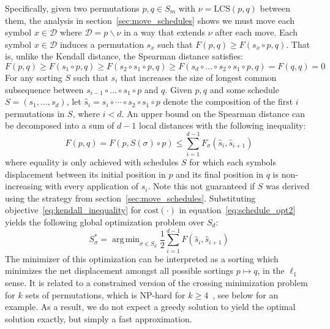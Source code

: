 \documentclass{siamart190516}
\DeclareMathOperator*{\argmin}{arg\,min}
\begin{document}
Specifically, given two permutations $p,q \in S_m$ with $\nu = \mathrm{LCS}(p,q)$ between them, the analysis in section~\ref{sec:move_schedules} shows we must move each symbol $x \in \mathcal{D}$ where $\mathcal{D} = p \smallsetminus \nu $ in a way that extends $\nu$ after each move. Each symbol $x \in \mathcal{D}$ induces a permutation $s_x$ such that $F(p, q) \geq F(s_x \circ p, q)$. That is, unlike the Kendall distance, the Spearman distance satisfies: 
$$ F(p, q) \geq F(s_1 \circ p, q) \geq F( s_2 \circ s_1 \circ p, q) \geq F( s_d \circ \dots \circ s_2 \circ s_1 \circ p, q)  = F(q,q) = 0 $$
For any sorting $S$ such that $s_{i}$ that increases the size of longest common subsequence between $s_{i-1} \circ \dots \circ s_1 \circ p$ and $q$. Given $p, q$ and some schedule $S = (s_1, \dots, s_d)$, let $\hat{s}_i =  s_i \circ \cdots \circ s_2 \circ s_1 \circ p$ denote the composition of the first $i$ permutations in $S$, where $i < d$. An upper bound on the Spearman distance can be decomposed into a sum of $d-1$ local distances with the following inequality:
\begin{equation}\label{eq:kendall_inequality}
F(p, q) = F(p, S(\sigma) \circ p) \leq \sum\limits_{i=1}^{d-1} F_\sigma(\hat{s}_i, \hat{s}_{i+1})
\end{equation}
where equality is only achieved with schedules $S$ for which each symbols displacement between its initial position in $p$ and its final position in $q$ is non-increasing with every application of $s_i$. Note this not guaranteed if $S$ was derived using the strategy from section~\ref{sec:move_schedules}.
Substituting objective~\ref{eq:kendall_inequality} for $\mathrm{cost}(\cdot)$ in equation~\ref{eq:schedule_opt2} yields the following global optimization problem over $S_d$: 
\begin{equation}\label{eq:schedule_opt_succ}
S_{\sigma}^\ast = \argmin_{\sigma \in S_d} \frac{1}{2} \sum\limits_{i = 1}^{d - 1} F(\hat{s}_i, \hat{s}_{i+1})
\end{equation}
The minimizer of this optimization can be interpreted as a sorting which minimizes the net displacement amongst all possible sortings $p \mapsto q$, in the $\ell_1$ sense. It is related to a constrained version of the crossing minimization problem for $k$ sets of permutations, which is NP-hard for $k \geq 4$~\cite{biedl2009complexity}, see below for an example. As a result, we do not expect a greedy solution to yield the optimal solution exactly, but simply a fast approximation.  
\end{document}
